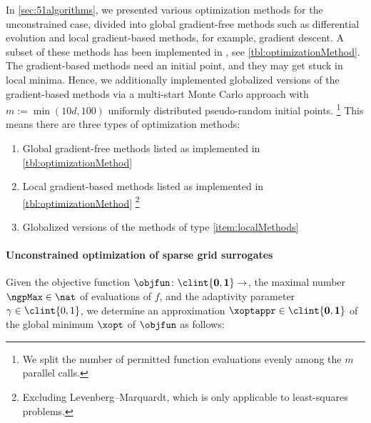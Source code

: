 In \cref{sec:51algorithms}, we presented various optimization methods
for the unconstrained case,
divided into global gradient-free methods such as differential evolution and
local gradient-based methods, for example, gradient descent.
A subset of these methods has been implemented in \sgpp{}
\cite{Pflueger10Spatially}, see \cref{tbl:optimizationMethod}.
The gradient-based methods need an initial point, and
they may get stuck in local minima.
Hence, we additionally implemented globalized versions
of the gradient-based methods
via a multi-start Monte Carlo approach with $m := \min(10d, 100)$
uniformly distributed pseudo-random initial points.%
\footnote{%
  We split the number of permitted function evaluations evenly
  among the $m$ parallel calls.%
}
This means there are three types of optimization methods:

\begin{enumerate}[label=T\arabic*.,ref=T\arabic*,leftmargin=2.7em]
  \item
  \label{item:globalMethods}
  Global gradient-free methods listed as implemented in
  \cref{tbl:optimizationMethod}
  
  \item
  \label{item:localMethods}
  Local gradient-based methods listed as implemented in
  \cref{tbl:optimizationMethod}%
  \footnote{%
     Excluding Levenberg--Marquardt, which is only applicable
     to least-squares problems.%
  }
  
  \item
  \label{item:globalizedMethods}
  Globalized versions of the methods of type \ref{item:localMethods}
\end{enumerate}

\paragraph{Unconstrained optimization of sparse grid surrogates}

Given the objective function $\objfun\colon \clint{\*0, \*1} \to \real$,
the maximal number $\ngpMax \in \nat$ of evaluations of $f$, and
the adaptivity parameter $\gamma \in \clint{0, 1}$,
we determine an approximation $\xoptappr \in \clint{\*0, \*1}$
of the global minimum $\xopt$ of $\objfun$ as follows:

